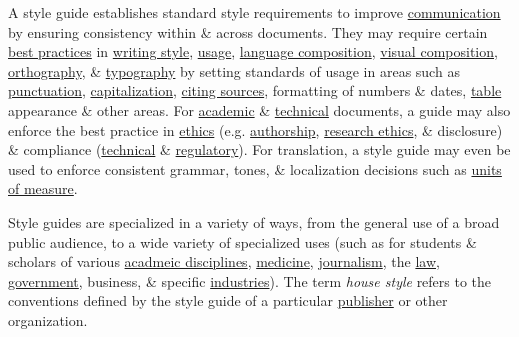 \documentclass{article}
\begin{document}
A style guide establishes standard style requirements to improve \href{https://en.wikipedia.org/wiki/Communication}{communication} by ensuring consistency within \& across documents. They may require certain \href{https://en.wikipedia.org/wiki/Best_practice}{best practices} in \href{https://en.wikipedia.org/wiki/Writing_style}{writing style}, \href{https://en.wikipedia.org/wiki/Usage_(language)}{usage}, \href{https://en.wikipedia.org/wiki/Composition_(language)}{language composition}, \href{https://en.wikipedia.org/wiki/Composition_(visual_arts)}{visual composition}, \href{https://en.wikipedia.org/wiki/Orthography}{orthography}, \& \href{https://en.wikipedia.org/wiki/Typography}{typography} by setting standards of usage in areas such as \href{https://en.wikipedia.org/wiki/Punctuation}{punctuation}, \href{https://en.wikipedia.org/wiki/Capitalization}{capitalization}, \href{https://en.wikipedia.org/wiki/Citation#Styles}{citing sources}, formatting of numbers \& dates, \href{https://en.wikipedia.org/wiki/Table_(information)}{table} appearance \& other areas. For \href{https://en.wikipedia.org/wiki/Academic_publishing}{academic} \& \href{https://en.wikipedia.org/wiki/Technical_communication}{technical} documents, a guide may also enforce the best practice in \href{https://en.wikipedia.org/wiki/Ethics}{ethics} (e.g. \href{https://en.wikipedia.org/wiki/Author}{authorship}, \href{https://en.wikipedia.org/wiki/Research_ethics}{research ethics}, \& disclosure) \& compliance (\href{https://en.wikipedia.org/wiki/Technical_standard}{technical} \& \href{https://en.wikipedia.org/wiki/Regulatory_compliance}{regulatory}). For translation, a style guide may even be used to enforce consistent grammar, tones, \& localization decisions such as \href{https://en.wikipedia.org/wiki/Unit_of_measurement}{units of measure}.

Style guides are specialized in a variety of ways, from the general use of a broad public audience, to a wide variety of specialized uses (such as for students \& scholars of various \href{https://en.wikipedia.org/wiki/Academic_discipline}{acadmeic disciplines}, \href{https://en.wikipedia.org/wiki/Medical_publishing}{medicine}, \href{https://en.wikipedia.org/wiki/Journalism}{journalism}, the \href{https://en.wikipedia.org/wiki/Legal_publication}{law}, \href{https://en.wikipedia.org/wiki/Government_Publishing_Office}{government}, business, \& specific \href{https://en.wikipedia.org/wiki/Industry_(economics)}{industries}). The term {\it house style} refers to the conventions defined by the style guide of a particular \href{https://en.wikipedia.org/wiki/Publisher}{publisher} or other organization.
\end{document}
